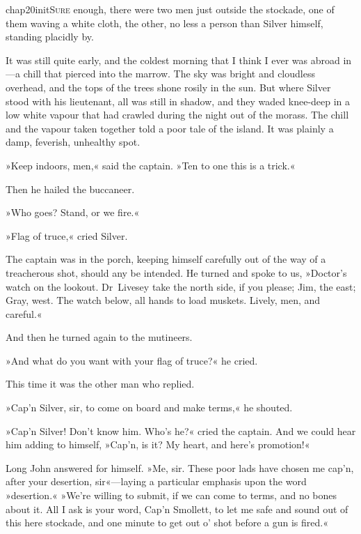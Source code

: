 
\lettrine[lines=5,image=true,findent=2pt]{chap20initS}{ure} enough, there were two men just outside the stockade, one of them waving a white cloth, the other, no less a person than Silver himself, standing placidly by.

\zz
It was still quite early, and the coldest morning that I think I ever was abroad in—a chill that pierced into the marrow. The sky was bright and cloudless overhead, and the tops of the trees shone rosily in the sun. But where Silver stood with his lieutenant, all was still in shadow, and they waded knee-deep in a low white vapour that had crawled during the night out of the morass. The chill and the vapour taken together told a poor tale of the island. It was plainly a damp, feverish, unhealthy spot.

»Keep indoors, men,« said the captain. »Ten to one this is a trick.«

Then he hailed the buccaneer.

»Who goes? Stand, or we fire.«

»Flag of truce,« cried Silver.

The captain was in the porch, keeping himself carefully out of the way of a treacherous shot, should any be intended. He turned and spoke to us, »Doctor's watch on the lookout. Dr~Livesey take the north side, if you please; Jim, the east; Gray, west. The watch below, all hands to load muskets. Lively, men, and careful.«

And then he turned again to the mutineers.

»And what do you want with your flag of truce?« he cried.

This time it was the other man who replied.

»Cap'n Silver, sir, to come on board and make terms,« he shouted.

»Cap'n Silver! Don't know him. Who's he?« cried the captain. And we could hear him adding to himself, »Cap'n, is it? My heart, and here's promotion!«

Long John answered for himself. »Me, sir. These poor lads have chosen me cap'n, after your desertion, sir«—laying a particular emphasis upon the word »desertion.« »We're willing to submit, if we can come to terms, and no bones about it. All I ask is your word, Cap'n Smollett, to let me safe and sound out of this here stockade, and one minute to get out o' shot before a gun is fired.«

